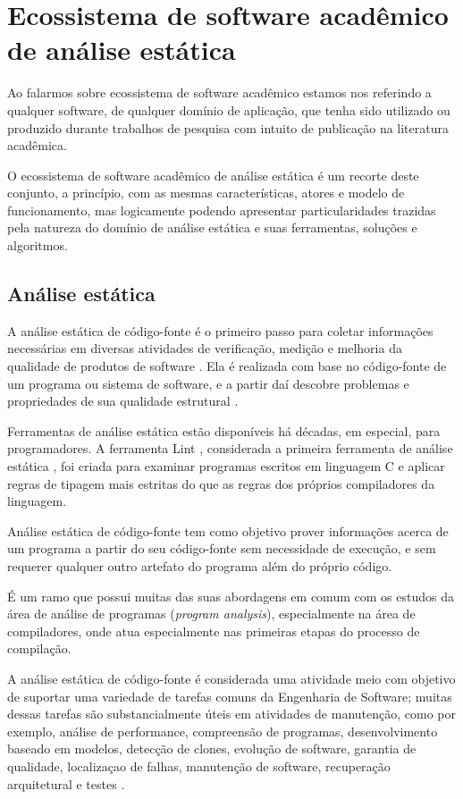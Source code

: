 \section{Ecossistema de software acadêmico de análise estática} \label{analise-estatica}

Ao falarmos sobre ecossistema de software acadêmico estamos nos referindo a
qualquer software, de qualquer domínio de aplicação, que tenha sido utilizado
ou produzido durante trabalhos de pesquisa com intuito de publicação na
literatura acadêmica.

O ecossistema de software acadêmico de análise estática é um recorte deste
conjunto, a princípio, com as mesmas características, atores e modelo de
funcionamento, mas logicamente podendo apresentar particularidades trazidas
pela natureza do domínio de análise estática e suas ferramentas, soluções e
algoritmos.

\subsection{Análise estática}

A análise estática de código-fonte é o primeiro passo para coletar informações
necessárias em diversas atividades de verificação, medição e melhoria da
qualidade de produtos de software \cite{cruz2009code, kirkov2010source}. Ela é
realizada com base no código-fonte de um programa ou sistema de software, e a
partir daí descobre problemas e propriedades de sua qualidade estrutural
\cite{chess2007secure}.

Ferramentas de análise estática estão disponíveis há décadas, em especial,
para programadores. A ferramenta Lint \cite{johnson1978lint}, considerada a
primeira ferramenta de análise estática \cite{gosain2015static}, foi criada para
examinar programas escritos em linguagem C e aplicar regras de tipagem mais
estritas do que as regras dos próprios compiladores da linguagem.

Análise estática de código-fonte tem como objetivo prover
informações acerca de um programa a partir do seu código-fonte sem
necessidade de execução, e sem requerer qualquer outro artefato do programa
além do próprio código.

É um ramo que possui muitas das suas abordagens em comum com os estudos da
área de análise de programas ({\it program analysis}), especialmente na área de
compiladores, onde atua especialmente nas primeiras etapas do processo de compilação.

A análise estática de código-fonte é considerada uma atividade meio com
objetivo de suportar uma variedade de tarefas comuns da Engenharia de
Software; muitas dessas tarefas são substancialmente úteis em atividades de
manutenção, como por exemplo,
análise de performance,
compreensão de programas,
desenvolvimento baseado em modelos,
detecção de clones,
evolução de software,
garantia de qualidade,
localizaçao de falhas,
manutenção de software,
recuperação arquitetural e
testes \cite{binkley2007source}.

